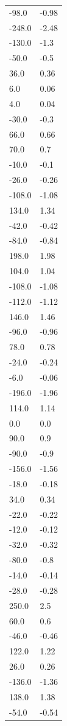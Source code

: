 \begin{longtable}{ll}
-98.0 & -0.98 \\
-248.0 & -2.48 \\
-130.0 & -1.3 \\
-50.0 & -0.5 \\
36.0 & 0.36 \\
6.0 & 0.06 \\
4.0 & 0.04 \\
-30.0 & -0.3 \\
66.0 & 0.66 \\
70.0 & 0.7 \\
-10.0 & -0.1 \\
-26.0 & -0.26 \\
-108.0 & -1.08 \\
134.0 & 1.34 \\
-42.0 & -0.42 \\
-84.0 & -0.84 \\
198.0 & 1.98 \\
104.0 & 1.04 \\
-108.0 & -1.08 \\
-112.0 & -1.12 \\
146.0 & 1.46 \\
-96.0 & -0.96 \\
78.0 & 0.78 \\
-24.0 & -0.24 \\
-6.0 & -0.06 \\
-196.0 & -1.96 \\
114.0 & 1.14 \\
0.0 & 0.0 \\
90.0 & 0.9 \\
-90.0 & -0.9 \\
-156.0 & -1.56 \\
-18.0 & -0.18 \\
34.0 & 0.34 \\
-22.0 & -0.22 \\
-12.0 & -0.12 \\
-32.0 & -0.32 \\
-80.0 & -0.8 \\
-14.0 & -0.14 \\
-28.0 & -0.28 \\
250.0 & 2.5 \\
60.0 & 0.6 \\
-46.0 & -0.46 \\
122.0 & 1.22 \\
26.0 & 0.26 \\
-136.0 & -1.36 \\
138.0 & 1.38 \\
-54.0 & -0.54 \\

\end{longtable}
